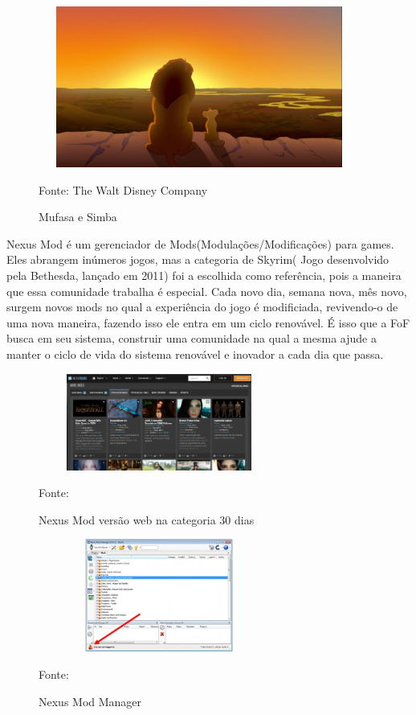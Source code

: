 \begin{figure}[!h]
	\centering
	\caption{Mufasa e Simba}
	\includegraphics[width=400px, height=200px]{./images/mufasa.jpg}
	\par{Fonte: The Walt Disney Company}
\end{figure}

Nexus Mod é um gerenciador de Mods(Modulações/Modificações) para games. Eles abrangem inúmeros jogos, mas a categoria de Skyrim( Jogo desenvolvido pela Bethesda, lançado em 2011) foi a escolhida como referência, pois a maneira que essa comunidade trabalha é especial. Cada novo dia, semana nova, mês novo, surgem novos mods no qual a experiência do jogo é modificiada, revivendo-o de uma nova maneira, fazendo isso ele entra em um ciclo renovável. 
É isso que a FoF busca em seu sistema, construir uma comunidade na qual a mesma ajude a manter o ciclo de vida do sistema renovável e inovador a cada dia que passa. 

\begin{figure}[!h]
	\centering
	\caption{Nexus Mod versão web na categoria 30 dias}
	\includegraphics[width=300px, height=120px]{./images/nexusMod.png}
	\par{Fonte: \cite{nexus-mod}}
\end{figure}

\begin{figure}[!h]
	\centering
	\caption{Nexus Mod Manager }
	\includegraphics[width=300px, height=140px]{./images/nexusMod3.jpg}
	\par{Fonte: \cite{nexus-mod}}
\end{figure}

